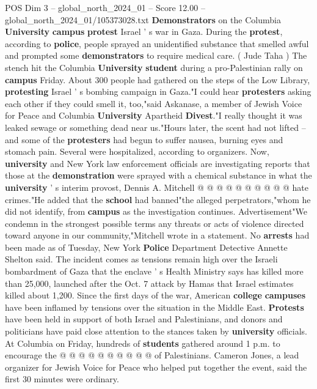 \begin{textsample}{POS Dim 3 – global\_north\_2024\_01 – Score 12.00 – global\_north\_2024\_01/105373028.txt}  \label{ex:f3_pos_226}
\textbf{Demonstrators} on the Columbia \textbf{University} \textbf{campus} \textbf{protest} Israel ' s war in Gaza.
During the \textbf{protest}, according to \textbf{police}, people sprayed an unidentified substance that smelled awful and prompted some \textbf{demonstrators} to require medical care. ( Jude Taha ) The stench hit the Columbia \textbf{University} \textbf{student} during a pro-Palestinian rally on \textbf{campus} Friday.
About 300 people had gathered on the steps of the Low Library, \textbf{protesting} Israel ' s bombing campaign in Gaza."I could hear \textbf{protesters} asking each other if they could smell it, too,"said Askanase, a member of Jewish Voice for Peace and Columbia \textbf{University} Apartheid \textbf{Divest}."I really thought it was leaked sewage or something dead near us."Hours later, the scent had not lifted -- and some of the \textbf{protesters} had begun to suffer nausea, burning eyes and stomach pain.
Several were hospitalized, according to organizers.
Now, \textbf{university} and New York law enforcement officials are investigating reports that those at the \textbf{demonstration} were sprayed with a chemical substance in what the \textbf{university} ' s interim provost, Dennis A.
Mitchell @ @ @ @ @ @ @ @ @ @ hate crimes."He added that the \textbf{school} had banned"the alleged perpetrators,"whom he did not identify, from \textbf{campus} as the investigation continues.
Advertisement"We condemn in the strongest possible terms any threats or acts of violence directed toward anyone in our community,"Mitchell wrote in a statement.
No \textbf{arrests} had been made as of Tuesday, New York \textbf{Police} Department Detective Annette Shelton said.
The incident comes as tensions remain high over the Israeli bombardment of Gaza that the enclave ' s Health Ministry says has killed more than 25,000, launched after the Oct. 7 attack by Hamas that Israel estimates killed about 1,200.
Since the first days of the war, American \textbf{college} \textbf{campuses} have been inflamed by tensions over the situation in the Middle East. \textbf{Protests} have been held in support of both Israel and Palestinians, and donors and politicians have paid close attention to the stances taken by \textbf{university} officials.
At Columbia on Friday, hundreds of \textbf{students} gathered around 1 p.m. to encourage the @ @ @ @ @ @ @ @ @ @ of Palestinians.
Cameron Jones, a lead organizer for Jewish Voice for Peace who helped put together the event, said the first 30 minutes were ordinary.

\end{textsample}
